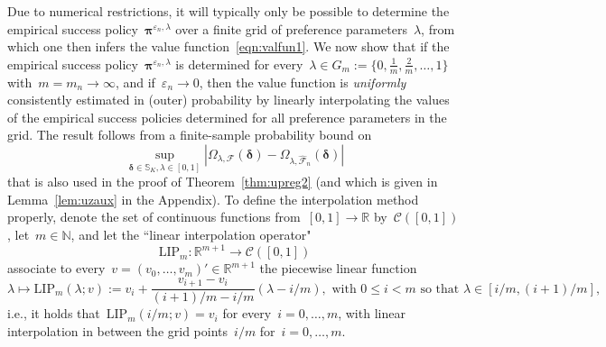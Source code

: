 \documentclass[11pt, a4paper]{article}
\newcommand{\N}{\mathbb{N}}
\newcommand{\R}{\mathbb{R}}
\theoremstyle{definition}
\begin{document}
Due to numerical restrictions, it will typically only be possible to determine the empirical success policy~$\bm{\pi}^{\varepsilon_n, \lambda}$ over a finite grid of preference parameters~$\lambda$, from which one then infers the value function~\eqref{eqn:valfun1}.  We now show that if the empirical success policy~$\bm{\pi}^{\varepsilon_n, \lambda}$ is determined for every~$\lambda \in G_{m} := \{0, \frac{1}{m}, \frac{2}{m}, \hdots, 1\}$ with~$m = m_n \to \infty$, and if~$\varepsilon_n \to 0$, then the value function is \emph{uniformly} consistently estimated in (outer) probability by linearly interpolating the values of the empirical success policies determined for all preference parameters in the grid. The result follows from a finite-sample probability bound on $$\sup_{\bm{\delta} \in \mathbb{S}_K, \lambda \in [0, 1]} \left|\Omega_{\lambda, \mathcal{F}}(\bm{\delta}) - \Omega_{\lambda, \hat{\mathcal{F}}_n}(\bm{\delta})  \right|$$ that is also used in the proof of Theorem~\ref{thm:upreg2} (and which is given in Lemma~\ref{lem:uzaux} in the Appendix). To define the interpolation method properly, denote the set of continuous functions from~$[0, 1] \to \R$ by~$\mathcal{C}([0, 1])$, let~$m \in \N$, and let the ``linear interpolation operator"~$$\mathrm{LIP}_{m}: \R^{m + 1} \to \mathcal{C}([0, 1])$$ associate to every~$v = (v_0, \hdots, v_m)' \in \R^{m+1}$ the piecewise linear function $$\lambda \mapsto \mathrm{LIP}_m(\lambda; v) :=  v_{i} + \frac{v_{i+1} - v_i}{(i+1)/m - i/m} \left(\lambda - i/m\right), \text{ with } 0 \leq i < m \text{ so that } \lambda \in [i/m, (i+1)/m],$$ i.e., it holds that~$\mathrm{LIP}_m(i/m; v) = v_i$ for every~$i = 0, \hdots, m$, with linear interpolation in between the grid points~$i/m$ for~$i = 0, \hdots, m$.
%
\end{document}
